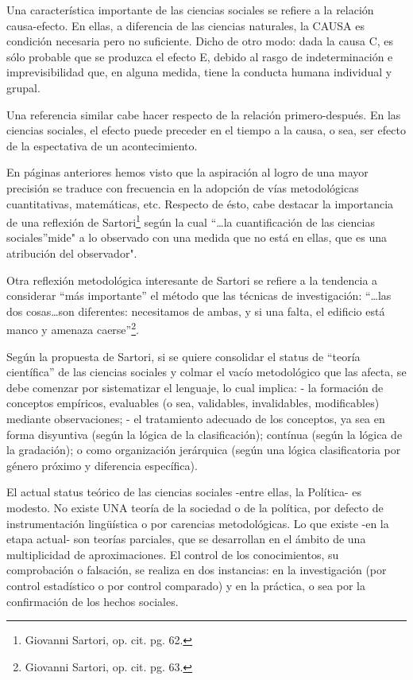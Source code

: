 \documentclass[
]{book}
\begin{document}
Una característica importante de las ciencias sociales se refiere a la relación causa-efecto. En ellas, a diferencia de las ciencias naturales, la CAUSA es condición necesaria pero no suficiente. Dicho de otro modo: dada la causa C, es sólo probable que se produzca el efecto E, debido al rasgo de indeterminación e imprevisibilidad que, en alguna medida, tiene la conducta humana individual y grupal.

Una referencia similar cabe hacer respecto de la relación primero-después. En las ciencias sociales, el efecto puede preceder en el tiempo a la causa, o sea, ser efecto de la espectativa de un acontecimiento.

En páginas anteriores hemos visto que la aspiración al logro de una mayor precisión se traduce con frecuencia en la adopción de vías metodológicas cuantitativas, matemáticas, etc. Respecto de ésto, cabe destacar la importancia de una reflexión de Sartori\footnote{Giovanni Sartori, op. cit. pg. 62.} según la cual ``\ldots la cuantificación de las ciencias sociales''mide" a lo observado con una medida que no está en ellas, que es una atribución del observador".

Otra reflexión metodológica interesante de Sartori se refiere a la tendencia a considerar ``más importante'' el método que las técnicas de investigación: ``\ldots las dos cosas\ldots son diferentes: necesitamos de ambas, y si una falta, el edificio está manco y amenaza caerse''\footnote{Giovanni Sartori, op. cit. pg. 63.}.

Según la propuesta de Sartori, si se quiere consolidar el status de ``teoría científica'' de las ciencias sociales y colmar el vacío metodológico que las afecta, se debe comenzar por sistematizar el lenguaje, lo cual implica: - la formación de conceptos empíricos, evaluables (o sea, validables, invalidables, modificables) mediante observaciones; - el tratamiento adecuado de los conceptos, ya sea en forma disyuntiva (según la lógica de la clasificación); contínua (según la lógica de la gradación); o como organización jerárquica (según una lógica clasificatoria por género próximo y diferencia específica).

El actual status teórico de las ciencias sociales -entre ellas, la Política- es modesto. No existe UNA teoría de la sociedad o de la política, por defecto de instrumentación lingüística o por carencias metodológicas. Lo que existe -en la etapa actual- son teorías parciales, que se desarrollan en el ámbito de una multiplicidad de aproximaciones. El control de los conocimientos, su comprobación o falsación, se realiza en dos instancias: en la investigación (por control estadístico o por control comparado) y en la práctica, o sea por la confirmación de los hechos sociales.

  
\end{document}
